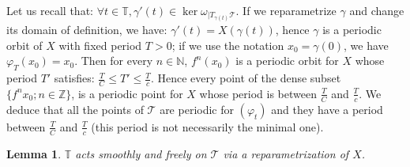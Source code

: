 \documentclass{dcds}
\newtheorem{lemma}[theorem]{Lemma}\newtheorem*{lem}{Lemma}
\theoremstyle{definition}
\begin{document}
Let us recall that: $\forall t\in{\mathbb {T}}, \gamma'(t)\in\ker\omega_{|T_{\gamma(t)}{\mathcal {T}}}$. If we reparametrize $\gamma$ and change its domain of definition, we have: $\gamma'(t)=X(\gamma(t))$, hence $\gamma$ is a periodic orbit of $X$ with fixed period $T>0$; if we use the notation $x_0=\gamma(0)$, we have $\varphi_T(x_0)=x_0$. Then for every $n\in{\mathbb {N}}$, $f^n(x_0)$ is a periodic orbit for $X$ whose period $T'$ satisfies: $\frac{T}{C}\leq T'\leq \frac{T}{c}$.
Hence every point of   the dense subset $\{ f^nx_0; n\in{\mathbb {Z}}\}$, is a periodic point for $X$ whose period is between $\frac{T}{C}$ and $\frac{T}{c}$. We deduce that all the points of ${\mathcal {T}}$ are periodic for $(\varphi_t)$ and they have a period between $\frac{T}{C}$ and $\frac{T}{c}$ (this period is not necessarily the minimal one).
\begin{lemma}\label{L1}
${\mathbb {T}}$ acts smoothly and freely on ${\mathcal {T}}$ via a reparametrization of $X$.
\end{lemma}
\end{document}
